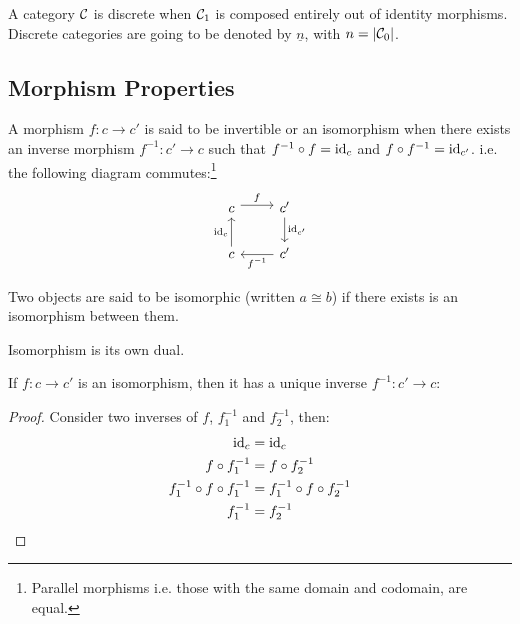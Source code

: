 \begin{definition}
  A category $\mathcal{C}$ is discrete when $\mathcal{C}_1$ is composed entirely out of identity
  morphisms. \parencite{awodey:category_theory} Discrete categories are going to
  be denoted by $\underline{n}$, with $n=|\mathcal{C}_0|$.
\end{definition}

\subsection{Morphism Properties}

\begin{definition}
  A morphism $f: c\to c'$ is said to be invertible or an isomorphism when there
  exists an inverse morphism $f^{-1}:c'\to c$ such that $f^{-1}\circ f =
  \mathrm{id}_{c}$ and $f\circ f^{-1} = \mathrm{id}_{c'}$.
  \parencite{lane:working_mathematician} i.e. the following diagram
  commutes:\footnote{Parallel morphisms i.e. those with the same domain and
  codomain, are equal.}
  \[\begin{tikzcd}
    c & {c'} \\
    c & {c'}
    \arrow["f", shift left=1, from=1-1, to=1-2]
    \arrow["{f^{-1}}", from=2-2, to=2-1]
    \arrow["{\mathrm{id}_c}", from=2-1, to=1-1]
    \arrow["{\mathrm{id}_{c'}}", from=1-2, to=2-2]
  \end{tikzcd}\]
\end{definition}

\begin{remark}
  Two objects are said to be isomorphic (written $a\cong b$) if there exists is
  an isomorphism between them.
\end{remark}

\begin{remark}
  Isomorphism is its own dual.
\end{remark}

\begin{theorem}
  If $f: c\to c'$ is an isomorphism, then it has a unique inverse $f^{-1}:c'\to
  c$:

  \begin{proof}
    Consider two inverses of $f$, $f^{-1}_1$ and $f^{-1}_2$, then:
    \[
      \begin{aligned}
        \mathrm{id}_c &= \mathrm{id}_c\\
        f\circ f^{-1}_1 &= f\circ f^{-1}_2\\
        f^{-1}_1 \circ f \circ f^{-1}_1 &= f^{-1}_1 \circ f \circ f^{-1}_2\\
        f^{-1}_1 &= f^{-1}_2
      \end{aligned}
    \]
  \end{proof}
\end{theorem}

